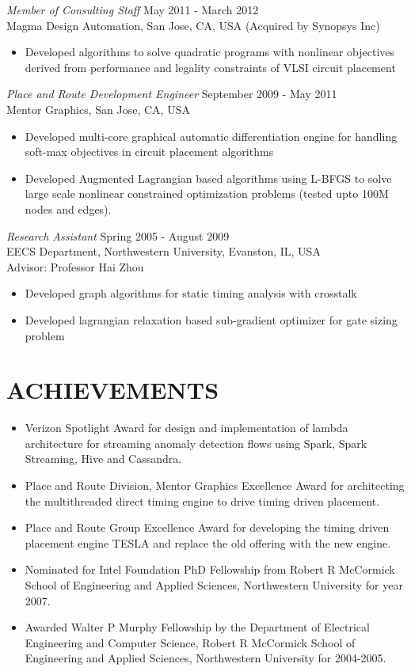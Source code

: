 \documentclass[margin]{res}
\begin{document}
\begin{resume}
{\sl Member of Consulting Staff} \hfill May 2011 - March 2012\\
Magma Design Automation, San Jose, CA, USA (Acquired by Synopsys Inc)
\begin{itemize} \itemsep -2pt
\item Developed algorithms to solve quadratic programs with nonlinear 
objectives derived from performance and legality constraints of VLSI circuit 
placement
\end{itemize}

{\sl Place and Route Development Engineer} \hfill September 2009 - May 2011\\
Mentor Graphics, San Jose, CA, USA
\begin{itemize} \itemsep -2pt
\item Developed multi-core graphical automatic differentiation engine for 
handling soft-max objectives in circuit placement algorithms
\item Developed Augmented Lagrangian based algorithms using L-BFGS to solve
  large scale nonlinear constrained optimization problems (tested upto 100M nodes and edges). 
\end{itemize}

{\sl Research Assistant} \hfill Spring 2005 - August 2009\\
EECS Department, Northwestern University, Evanston, IL, USA\\
Advisor: Professor Hai Zhou
\begin{itemize} \itemsep -2pt
\item Developed graph algorithms for static timing analysis with crosstalk
\item Developed lagrangian relaxation based sub-gradient optimizer for gate sizing problem
\end{itemize}

\section{ACHIEVEMENTS}
\begin{itemize} \itemsep -2pt
\item Verizon Spotlight Award for design and implementation of lambda architecture for streaming anomaly detection flows using Spark, Spark Streaming, Hive and Cassandra.
\item Place and Route Division, Mentor Graphics Excellence Award for architecting the multithreaded direct timing engine to drive timing driven placement.
\item Place and Route Group Excellence Award for developing the timing driven placement engine TESLA and replace the old offering with the new engine.  
\item Nominated for Intel Foundation PhD Fellowship from Robert R McCormick School of Engineering and Applied Sciences, Northwestern University for year 2007.
\item Awarded Walter P Murphy Fellowship by the Department of Electrical Engineering and Computer Science, Robert R McCormick School of Engineering and Applied 
  Sciences, Northwestern University for 2004-2005.
\end{itemize}


\end{resume}
\end{document}
